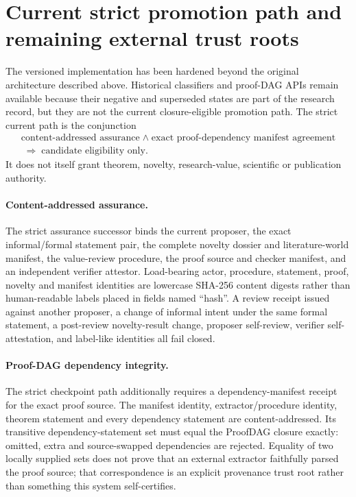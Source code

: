\section{Current strict promotion path and remaining external trust roots}
\label{sec:strict-current-promotion}

The versioned implementation has been hardened beyond the original architecture described above.  Historical classifiers and proof-DAG APIs remain available because their negative and superseded states are part of the research record, but they are not the current closure-eligible promotion path.  The strict current path is the conjunction
\[
\begin{gathered}
\text{content-addressed assurance}
\;\land\;
\text{exact proof-dependency manifest agreement}
\\[2ex]
\;\Longrightarrow\;
\text{candidate eligibility only}.
\end{gathered}
\]
It does not itself grant theorem, novelty, research-value, scientific or publication authority.

\paragraph{Content-addressed assurance.}
The strict assurance successor binds the current proposer, the exact informal/formal statement pair, the complete novelty dossier and literature-world manifest, the value-review procedure, the proof source and checker manifest, and an independent verifier attestor.  Load-bearing actor, procedure, statement, proof, novelty and manifest identities are lowercase SHA-256 content digests rather than human-readable labels placed in fields named ``hash''.  A review receipt issued against another proposer, a change of informal intent under the same formal statement, a post-review novelty-result change, proposer self-review, verifier self-attestation, and label-like identities all fail closed.

\paragraph{Proof-DAG dependency integrity.}
The strict checkpoint path additionally requires a dependency-manifest receipt for the exact proof source.  The manifest identity, extractor/\allowbreak procedure identity, theorem statement and every dependency statement are content-addressed.  Its transitive dependency-statement set must equal the ProofDAG closure exactly: omitted, extra and source-swapped dependencies are rejected.  Equality of two locally supplied sets does not prove that an external extractor faithfully parsed the proof source; that correspondence is an explicit provenance trust root rather than something this system self-certifies.

